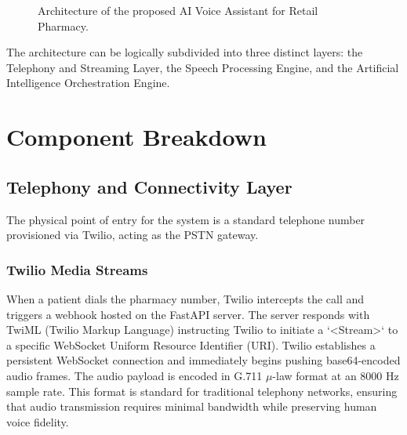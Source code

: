\documentclass[conference,a4paper]{IEEEtran}
\begin{document}
\begin{figure}[t]

\caption{Architecture of the proposed AI Voice Assistant for Retail Pharmacy.}
\label{fig:architecture}
\end{figure}

The architecture can be logically subdivided into three distinct layers: the Telephony and Streaming Layer, the Speech Processing Engine, and the Artificial Intelligence Orchestration Engine.

\section{Component Breakdown}

\subsection{Telephony and Connectivity Layer}
The physical point of entry for the system is a standard telephone number provisioned via Twilio, acting as the PSTN gateway. 

\subsubsection{Twilio Media Streams}
When a patient dials the pharmacy number, Twilio intercepts the call and triggers a webhook hosted on the FastAPI server. The server responds with TwiML (Twilio Markup Language) instructing Twilio to initiate a `<Stream>` to a specific WebSocket Uniform Resource Identifier (URI). Twilio establishes a persistent WebSocket connection and immediately begins pushing base64-encoded audio frames. The audio payload is encoded in G.711 $\mu$-law format at an 8000 Hz sample rate. This format is standard for traditional telephony networks, ensuring that audio transmission requires minimal bandwidth while preserving human voice fidelity.
\end{document}
